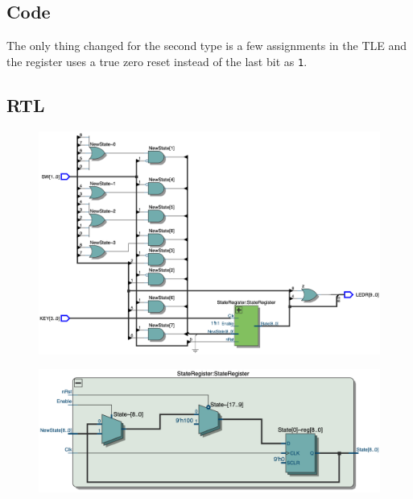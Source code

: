 \documentclass{article}
\begin{document}
\clearpage
\subsection{Code}
\clearpage
{}
The only thing changed for the second type is a few assignments in the TLE and the register uses a true zero reset instead of the last bit as \verb|1|.

\clearpage
{}
\clearpage
{}

\clearpage
\subsection{RTL}

\begin{figure}[h]
    \centering
    \includegraphics[width=1\textwidth]{Figures/Part1_RTL_TLE_old.jpg}
    \label{fig:p1_RTL_TLE_old}
\end{figure}
\hfill
\begin{figure}[h]
    \centering
    \includegraphics[width=1\textwidth]{Figures/Part1_RTL_StateRegister_old.jpg}
    \label{fig:p1_RTL_StateReg_old}
\end{figure}
\end{document}
